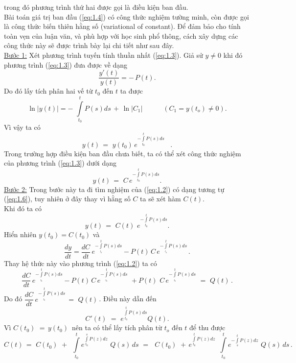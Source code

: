trong đó phương trình thứ hai được gọi là điều kiện ban đầu. \\
Bài toán giá trị ban đầu (\ref{eq:1.4}) có công thức nghiệm tường minh, còn được gọi là công thức biến thiên hằng số (variational of constant). Để đảm bảo cho tính toàn vẹn của luận văn, và phù hợp với học sinh phổ thông, cách xây dựng các công thức này sẽ được trình bày lại chi tiết như sau đây. \\
\underline{Bước 1:} Xét phương trình tuyến tính thuần nhất (\ref{eq:1.3}). Giả sử $y\ne 0$  khi đó phương trình  (\ref{eq:1.3}) đưa được về dạng $$\frac{y'(t)}{y(t)}  =-\,P(t).$$
Do đó lấy tích phân hai vế từ ${{t}_{0}}$ đến $t$ ta được 
\[\ln\left| y(t) \right|=-\,\,\int\limits_{{{t}_{0}}}^{t}{P(s)ds\,+\,\ln |{{C}_{1}}|\,\,\,\,\,\,\,\,\,\,\,\,\,\,\,\,\,\,({{C}_{1}}=y({{t}_{o}})\ne 0).}\]
Vì vậy ta có                           
\begin{equation}
	y(t)\,=\,\,y({{t}_{0}})\,{{e}^{-\int\limits_{{{t}_{0}}}^{t}{P(s)ds}}}\,\,\,\,\,.  
	\label{eq:1.5}
\end{equation}                                   Trong trường hợp điều kiện ban đầu chưa biết, ta có thể xét công thức nghiệm của phương trình (\ref{eq:1.3}) dưới dạng 
\begin{equation}
	y(t)\,=\,\,C\,{{e}^{-\int\limits_{{{t}_{0}}}^{t}{P(s)ds}}}.
\label{eq:1.6}
\end{equation}
\underline{Bước 2:} Trong bước này ta đi tìm nghiệm của (\ref{eq:1.2}) có dạng tương tự (\ref{eq:1.6}), tuy nhiên ở đây thay vì hằng số $C$ ta sẽ xét hàm $C(t)$. \\
Khi đó ta có
\begin{equation}
	y(t)\,=\,\,C(t)\,\,{{e}^{-\int\limits_{{{t}_{0}}}^{t}{P(s)ds}}}.
	\label{eq:1.7}
\end{equation}
Hiển nhiên $y({{t}_{0}})=C({{t}_{0}})$ và \[\frac{dy}{dt}=\dfrac{dC}{dt}\,{{e}^{-\int\limits_{_{{{t}_{0}}}}^{t}{P(s)ds}}}-P(t)\,C\,{{e}^{-\int\limits_{_{{{t}_{0}}}}^{t}{P(s)ds}}}\,.\]
Thay hệ thức này vào phương trình (\ref{eq:1.2}) ta có \[\dfrac{dC}{dt}\,{{e}^{-\int\limits_{_{{{t}_{0}}}}^{t}{P(s)ds}}}-P(t)\,C\,{{e}^{-\int\limits_{_{{{t}_{0}}}}^{t}{P(s)ds}}}\,\,+P(t)\,\,C\,{{e}^{-\int\limits_{_{{{t}_{0}}}}^{t}{P(s)ds}}}\,\,=\,\,Q(t)\,.\]
Do đó $\dfrac{dC}{dt}\,{{e}^{-\int\limits_{_{{{t}_{0}}}}^{t}{P(s)ds}}}\,=\,\,Q(t)\,$. Điều này dẫn đến \[C'(t)\,\,=\,\,{{e}^{\int\limits_{{{t}_{0}}}^{t}{P(s)ds}}}Q(t).\]
Vì $C({{t}_{0}})\,\,=\,y({{t}_{0}})\,$ nên ta có thể lấy tích phân từ ${{t}_{o}}$ đến $t$ để thu được \[C(t)\,=\,\,C({{t}_{0}})\,\,+\,\,\,\int\limits_{{{t}_{0}}}^{t}{{{e}^{\int\limits_{{{t}_{0}}}^{s}{P(z)dz}}}}\,\,Q(s)\,ds\,\,=\,\,\,\,C({{t}_{0}})\,\,+\,{{e}^{\int\limits_{{{t}_{0}}}^{t}{P(z)dz}}}\,\,\,\int\limits_{{{t}_{0}}}^{t}{{{e}^{-\int\limits_{s}^{t}{P(z)dz}}}}\,\,Q(s)\,ds\,.\]
